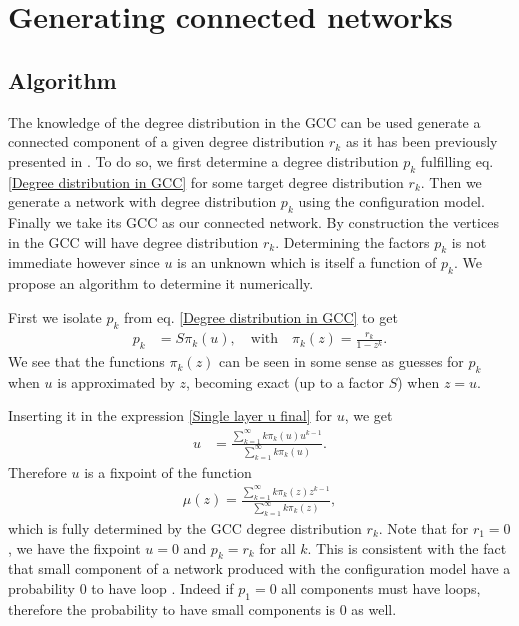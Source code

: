 \documentclass[
11pt, %
american, %
singlespacing, %
final, %
nolistspacing, %
liststotoc, %
headsepline, %
]{MastersDoctoralThesis} %
\begin{document}
\section{Generating connected networks}
\label{Section: Generating connected networks}

\subsection{Algorithm}

The knowledge of the degree distribution in the GCC can be used generate a connected component of a given degree distribution $r_k$ as it has been previously presented in \cite{bialas2008correlations}. To do so, we first determine a degree distribution $p_k$ fulfilling eq. \eqref{Degree distribution in GCC} for some target degree distribution $r_k$. Then we generate a network with degree distribution $p_k$ using the configuration model. Finally we take its GCC as our connected network. By construction the vertices in the GCC will have degree distribution $r_k$. Determining the factors $p_k$ is not immediate however since $u$ is an unknown which is itself a function of $p_k$. We propose an algorithm to determine it numerically.

First we isolate $p_k$ from eq. \eqref{Degree distribution in GCC} to get
\begin{align}
	p_k &= S \pi_k(u), \quad \text{with} \quad \pi_k(z) = \frac{r_k}{1 - z^k}.
\end{align}
We see that the functions $\pi_k(z)$ can be seen in some sense as guesses for $p_k$ when $u$ is approximated by $z$, becoming exact (up to a factor $S$) when $z = u$.

Inserting it in the expression \eqref{Single layer u final} for $u$, we get
\begin{align}
	u &= \frac{\sum_{k=1}^\infty k \pi_k(u) u^{k-1}}{\sum_{k=1}^\infty k \pi_k(u)}. \label{Fixpoint equation for u}
\end{align}  
Therefore $u$ is a fixpoint of the function
\begin{align}
	\mu(z) = \frac{\sum_{k=1}^\infty k \pi_k(z) z^{k-1}}{\sum_{k=1}^\infty k \pi_k(z)}, \label{Defition of mu}
\end{align}
which is fully determined by the GCC degree distribution $r_k$. Note that for $r_1 = 0$, we have the fixpoint $u = 0$ and $p_k = r_k$ for all $k$. This is consistent with the fact that small component of a network produced with the configuration model have a probability $0$ to have loop \cite{newman2010networks}. Indeed if $p_1 = 0$ all components must have loops, therefore the probability to have small components is $0$ as well.
\end{document}
